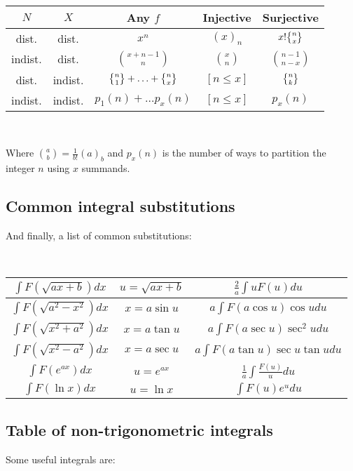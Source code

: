 \

\begin{tabular}{|c|c|c|c|c|}
    \hline
    $N$ & $X$ & Any $f$ & Injective & Surjective \\ \hline
    dist. & dist. & $x^n$ & $(x)_n$ & $x! \stirlingsecond{n}{x}$ \\ \hline
    indist. & dist. & $\binom{x+n-1}{n}$ & $\binom{x}{n}$ & $\binom{n-1}{n-x}$ \\ \hline
    dist. & indist. & $\stirlingsecond{n}{1} + \ldots + \stirlingsecond{n}{x}$ & $[n \leq x]$ & $\stirlingsecond{n}{k}$ \\ \hline
    indist. & indist. & $p_1(n) + \ldots p_x(n)$ & $[n \leq x]$ & $p_x(n)$ \\ \hline
\end{tabular}

\

Where $\binom{a}{b} = \frac{1}{b!}(a)_b $ and $p_x(n)$ is the number of ways to partition the integer $n$ using $x$ summands.

\subsection{Common integral substitutions} And finally, a list of common substitutions:

\

\begin{tabular}{|c|c|c|}
    \hline
    $\int F(\sqrt{ax + b}) dx$ & $u = \sqrt{ax + b}$ & $\frac{2}{a} \int u F(u) du$ \\ \hline
    $\int F(\sqrt{a^2 - x^2}) dx$ & $x = a \sin u$ & $a \int F(a \cos u) \cos u du$ \\ \hline
    $\int F(\sqrt{x^2 + a^2}) dx$ & $x = a \tan u$ & $a \int F(a \sec u) \sec^2 u du$ \\ \hline
    $\int F(\sqrt{x^2 - a^2}) dx$ & $x = a \sec u$ & $a \int F(a \tan u) \sec u \tan u du$ \\ \hline
    $\int F(e^{ax}) dx$ & $u = e^{ax}$ & $\frac{1}{a} \int \frac{F(u)}{u} du$ \\ \hline
    $\int F(\ln x) dx$ & $u = \ln x$ & $\int F(u) e^u du$ \\ \hline
\end{tabular}

\subsection{Table of non-trigonometric integrals}
Some useful integrals are:

